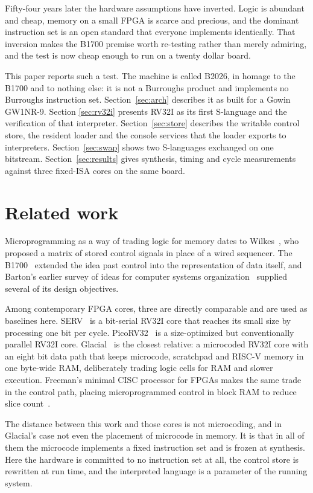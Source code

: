 \documentclass[11pt,a4paper]{article}
\begin{document}
Fifty-four years later the hardware assumptions have inverted. Logic is
abundant and cheap, memory on a small FPGA is scarce and precious, and
the dominant instruction set is an open standard that everyone
implements identically. That inversion makes the B1700 premise worth
re-testing rather than merely admiring, and the test is now cheap
enough to run on a twenty dollar board.

This paper reports such a test. The machine is called B2026, in homage
to the B1700 and to nothing else: it is not a Burroughs product and
implements no Burroughs instruction set. Section~\ref{sec:arch}
describes it as built for a Gowin GW1NR-9. Section
\ref{sec:rv32i} presents RV32I as its first S-language and the
verification of that interpreter. Section~\ref{sec:store} describes the
writable control store, the resident loader and the console services
that the loader exports to interpreters. Section~\ref{sec:swap} shows
two S-languages exchanged on one bitstream. Section~\ref{sec:results}
gives synthesis, timing and cycle measurements against three fixed-ISA
cores on the same board.

\section{Related work}

Microprogramming as a way of trading logic for memory dates to
Wilkes~\cite{wilkes1951}, who proposed a matrix of stored control
signals in place of a wired sequencer. The B1700~\cite{wilner1972}
extended the idea past control into the representation of data itself,
and Barton's earlier survey of ideas for computer systems
organization~\cite{barton1970} supplied several of its design
objectives.

Among contemporary FPGA cores, three are directly comparable and are
used as baselines here. SERV~\cite{serv} is a bit-serial RV32I core that reaches
its small size by processing one bit per cycle. PicoRV32~\cite{picorv32} is a
size-optimized but conventionally parallel RV32I core.
Glacial~\cite{glacial} is the closest relative: a microcoded RV32I core with an eight bit data path
that keeps microcode, scratchpad and RISC-V memory in one byte-wide
RAM, deliberately trading logic cells for RAM and slower execution.
Freeman's minimal CISC processor for FPGAs makes the same trade in the
control path, placing microprogrammed control in block RAM to reduce
slice count~\cite{freeman2004}.

The distance between this work and those cores is not microcoding, and
in Glacial's case not even the placement of microcode in memory. It is
that in all of them the microcode implements a fixed instruction set
and is frozen at synthesis. Here the hardware is committed to no
instruction set at all, the control store is rewritten at run time, and
the interpreted language is a parameter of the running system.
\end{document}
